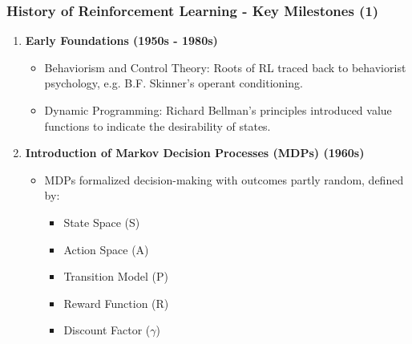 \documentclass{beamer}
\begin{document}
\begin{frame}[fragile]
    \frametitle{History of Reinforcement Learning - Key Milestones (1)}
    \begin{enumerate}
        \item \textbf{Early Foundations (1950s - 1980s)}
        \begin{itemize}
            \item Behaviorism and Control Theory: Roots of RL traced back to behaviorist psychology, e.g. B.F. Skinner's operant conditioning.
            \item Dynamic Programming: Richard Bellman's principles introduced value functions to indicate the desirability of states.
        \end{itemize}
        
        \item \textbf{Introduction of Markov Decision Processes (MDPs) (1960s)}
        \begin{itemize}
            \item MDPs formalized decision-making with outcomes partly random, defined by:
            \begin{itemize}
                \item State Space (S)
                \item Action Space (A)
                \item Transition Model (P)
                \item Reward Function (R)
                \item Discount Factor ($\gamma$)
            \end{itemize}
        \end{itemize}
    \end{enumerate}
\end{frame}
\end{document}
